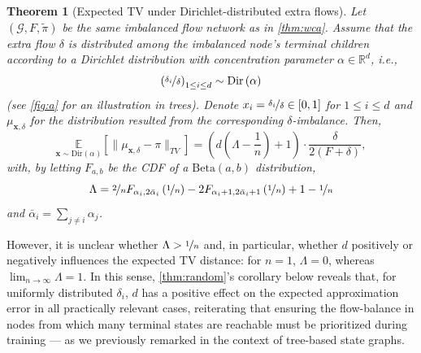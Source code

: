 \documentclass{article}
\theoremstyle{plain}
\newtheorem{theorem}{Theorem}[section]
\theoremstyle{definition}
\theoremstyle{remark}
\theoremstyle{remark}
\begin{document}
\begin{theorem}[Expected TV under Dirichlet-distributed extra flows]\label{thm:random} 
    Let $(\mathcal{G}, F, \tilde{\pi})$ be the same imbalanced flow network as in \autoref{thm:wca}. Assume that the extra flow $\delta$ is distributed among the imbalanced node's terminal children according to a Dirichlet distribution with concentration parameter $\alpha \in \mathbb{R}^{d}$, i.e., 
    \begin{equation*}
        \left(\nicefrac{\delta_{i}}{\delta}\right)_{1 \le i \le d} \sim \textrm{Dir}\left(\alpha\right) %
    \end{equation*}
    (see \autoref{fig:a} for an illustration in trees). Denote $x_{i} = \nicefrac{\delta_{i}}{\delta} \in [0, 1]$ for $1 \le i \le d$ and $\mu_{\mathbf{x}, \delta}$ for the distribution resulted from the corresponding $\delta$-imbalance. Then, 
    \begin{equation*}
        \underset{\mathbf{x} \sim \textrm{Dir}(\alpha)}{\mathbb{E}} \left[ \|\mu_{\mathbf{x}, \delta} - \pi\|_{TV} \right] = \left( d \left( \Lambda - \frac{1}{n} \right) + 1 \right) \cdot \frac{\delta}{2(F + \delta)}, %
    \end{equation*}
    with, by letting $F_{a,  b}$ be the CDF of a $\textrm{Beta}(a, b)$ distribution,  
    \begin{equation*}
        \Lambda = \nicefrac{2}{n} F_{\alpha_{i}, 2\bar{\alpha}_{i}} \left( \nicefrac{1}{n} \right) - 2 F_{\alpha_{i} + 1, 2\bar{\alpha}_{i} + 1} \left( \nicefrac{1}{n} \right) + 1 - \nicefrac{1}{n} %
    \end{equation*}
    and $\bar{\alpha}_{i} = \sum_{j \neq i} \alpha_{j}$. 
\end{theorem}

However, it is unclear whether $\Lambda > \nicefrac{1}{n}$ and, in particular, whether $d$ positively or negatively influences the expected TV distance: for $n = 1$, $\Lambda = 0$, whereas $\lim_{n \rightarrow \infty} \Lambda = 1$. In this sense, \autoref{thm:random}'s corollary below reveals that, for uniformly distributed $\delta_{i}$, $d$ has a positive effect on the expected approximation error in all practically relevant cases, reiterating that ensuring the flow-balance in nodes from which many terminal states are reachable must be prioritized during training --- as we previously remarked in the context of tree-based state graphs. 
\end{document}
